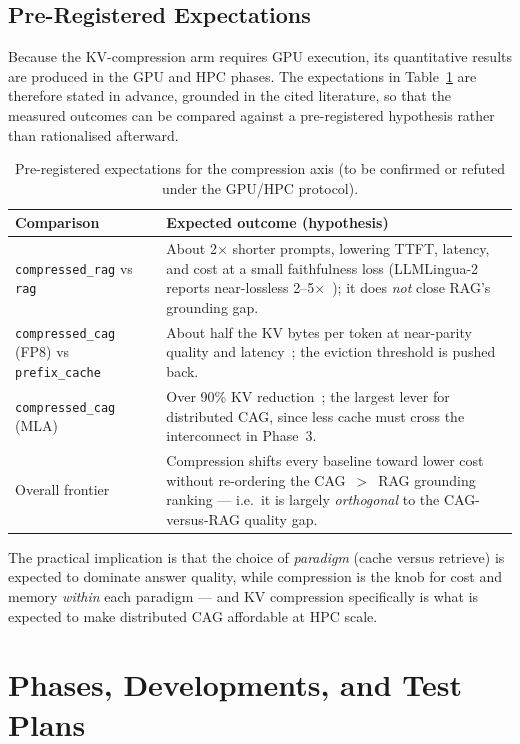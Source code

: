 \documentclass[12pt,a4paper]{article}
\let\cite\citep
\begin{document}
\subsection{Pre-Registered Expectations}

Because the KV-compression arm requires GPU execution, its quantitative results are
produced in the GPU and HPC phases. The expectations in Table~\ref{tab:compexpect}
are therefore stated in advance, grounded in the cited literature, so that the
measured outcomes can be compared against a pre-registered hypothesis rather than
rationalised afterward.

\begin{table}[H]
\centering
\caption{Pre-registered expectations for the compression axis (to be confirmed or
refuted under the GPU/HPC protocol).}
\label{tab:compexpect}
\footnotesize
\begin{tabular}{@{}p{3.0cm}p{8.6cm}@{}}
\toprule
\textbf{Comparison} & \textbf{Expected outcome (hypothesis)} \\
\midrule
\texttt{compressed\_rag} vs \texttt{rag} & About 2$\times$ shorter prompts, lowering TTFT, latency, and cost at a small faithfulness loss (LLMLingua-2 reports near-lossless 2--5$\times$~\cite{llmlingua2}); it does \emph{not} close RAG's grounding gap. \\
\texttt{compressed\_cag} (FP8) vs \texttt{prefix\_cache} & About half the KV bytes per token at near-parity quality and latency~\cite{kvtuner}; the eviction threshold is pushed back. \\
\texttt{compressed\_cag} (MLA) & Over 90\% KV reduction~\cite{deepseekv2}; the largest lever for distributed CAG, since less cache must cross the interconnect in Phase~3. \\
Overall frontier & Compression shifts every baseline toward lower cost without re-ordering the CAG~$>$~RAG grounding ranking --- i.e.\ it is largely \emph{orthogonal} to the CAG-versus-RAG quality gap. \\
\bottomrule
\end{tabular}
\end{table}

The practical implication is that the choice of \emph{paradigm} (cache versus
retrieve) is expected to dominate answer quality, while compression is the knob for
cost and memory \emph{within} each paradigm --- and KV compression specifically is
what is expected to make distributed CAG affordable at HPC scale.

\section{Phases, Developments, and Test Plans}
\label{sec:phases}
\end{document}
